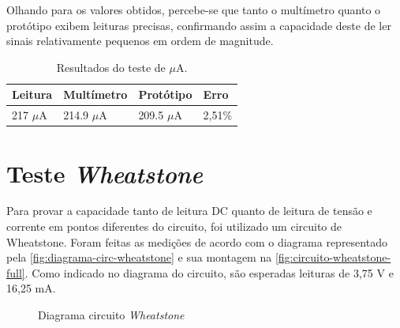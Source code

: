 Olhando para os valores obtidos, percebe-se que tanto o multímetro quanto o protótipo exibem leituras precisas, confirmando assim a capacidade deste de ler sinais relativamente pequenos em ordem de magnitude.

\begin{table}[!ht]
    \centering
    \caption{Resultados do teste de $\mu$A.}
    \vspace*{5mm}
    \label{tab:resultados-ua}
    \begin{tabular}{ l l l l }
        \hline
        \textbf{Leitura}  & \textbf{Multímetro}  & \textbf{Protótipo}  & \textbf{Erro}   \\ \hline
        217 $\mu$A        & 214.9 $\mu$A         & 209.5 $\mu$A        & 2,51\%             \\ \hline
    \end{tabular}
    \fonte{}
\end{table}

\section{Teste \textit{Wheatstone}}\label{teste-Wheatstone}

Para provar a capacidade tanto de leitura DC quanto de leitura de tensão e corrente em pontos diferentes do circuito, foi utilizado um circuito de Wheatstone. Foram feitas as medições de acordo com o diagrama representado pela \autoref{fig:diagrama-circ-wheatstone} e sua montagem na \autoref{fig:circuito-wheatstone-full}. Como indicado no diagrama do circuito, são esperadas leituras de 3,75 V e 16,25 mA.

\begin{figure}[htb!]
    \caption{Diagrama circuito \textit{Wheatstone}}
    \vspace*{5mm}
    \label{fig:diagrama-circ-wheatstone}
    \fonte{}
\end{figure}

